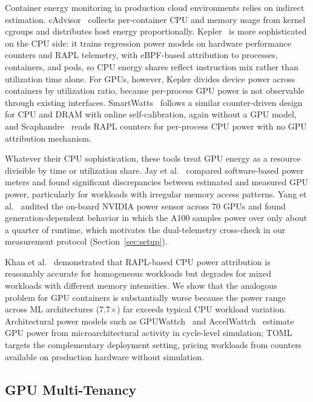 \documentclass[conference]{IEEEtran}
\begin{document}
Container energy monitoring in production cloud environments relies on indirect estimation. cAdvisor~\cite{cadvisor2024} collects per-container CPU and memory usage from kernel cgroups and distributes host energy proportionally. Kepler~\cite{kepler2023} is more sophisticated on the CPU side: it trains regression power models on hardware performance counters and RAPL telemetry, with eBPF-based attribution to processes, containers, and pods, so CPU energy shares reflect instruction mix rather than utilization time alone. For GPUs, however, Kepler divides device power across containers by utilization ratio, because per-process GPU power is not observable through existing interfaces. SmartWatts~\cite{fieni2020smartwatts} follows a similar counter-driven design for CPU and DRAM with online self-calibration, again without a GPU model, and Scaphandre~\cite{scaphandre2023} reads RAPL counters for per-process CPU power with no GPU attribution mechanism.

Whatever their CPU sophistication, these tools treat GPU energy as a resource divisible by time or utilization share. Jay et al.~\cite{jay2023experimental} compared software-based power meters and found significant discrepancies between estimated and measured GPU power, particularly for workloads with irregular memory access patterns. Yang et al.~\cite{yang2024nvidiasmi} audited the on-board NVIDIA power sensor across 70 GPUs and found generation-dependent behavior in which the A100 samples power over only about a quarter of runtime, which motivates the dual-telemetry cross-check in our measurement protocol (Section~\ref{sec:setup}).

Khan et al.~\cite{khan2018rapl} demonstrated that RAPL-based CPU power attribution is reasonably accurate for homogeneous workloads but degrades for mixed workloads with different memory intensities. We show that the analogous problem for GPU containers is substantially worse because the power range across ML architectures (7.7$\times$) far exceeds typical CPU workload variation. Architectural power models such as GPUWattch~\cite{leng2013gpuwattch} and AccelWattch~\cite{kandiah2021accelwattch} estimate GPU power from microarchitectural activity in cycle-level simulation; TOML targets the complementary deployment setting, pricing workloads from counters available on production hardware without simulation.

\subsection{GPU Multi-Tenancy}
\label{sec:multitenancy}
\end{document}
